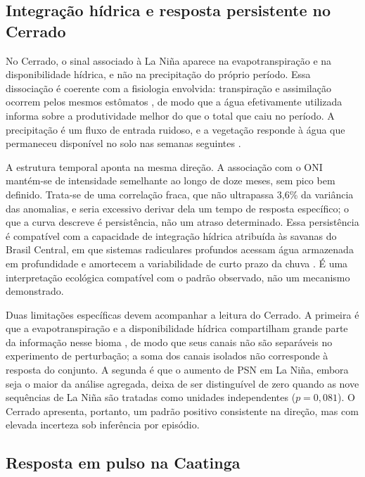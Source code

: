 \documentclass[a4paper,fleqn]{cas-sc}
\begin{document}
\subsection{Integração hídrica e resposta persistente no Cerrado}

No Cerrado, o sinal associado à La Niña aparece na evapotranspiração e na disponibilidade hídrica, e não na precipitação do próprio período. Essa dissociação é coerente com a fisiologia envolvida: transpiração e assimilação ocorrem pelos mesmos estômatos \citep{lawson2019}, de modo que a água efetivamente utilizada informa sobre a produtividade melhor do que o total que caiu no período. A precipitação é um fluxo de entrada ruidoso, e a vegetação responde à água que permaneceu disponível no solo nas semanas seguintes \citep{oliveira2005, schwinning2004}.

A estrutura temporal aponta na mesma direção. A associação com o ONI mantém-se de intensidade semelhante ao longo de doze meses, sem pico bem definido. Trata-se de uma correlação fraca, que não ultrapassa 3,6\% da variância das anomalias, e seria excessivo derivar dela um tempo de resposta específico; o que a curva descreve é persistência, não um atraso determinado. Essa persistência é compatível com a capacidade de integração hídrica atribuída às savanas do Brasil Central, em que sistemas radiculares profundos acessam água armazenada em profundidade e amortecem a variabilidade de curto prazo da chuva \citep{oliveira2005, bucci2008}. É uma interpretação ecológica compatível com o padrão observado, não um mecanismo demonstrado.

Duas limitações específicas devem acompanhar a leitura do Cerrado. A primeira é que a evapotranspiração e a disponibilidade hídrica compartilham grande parte da informação nesse bioma \citep{oliveira2026}, de modo que seus canais não são separáveis no experimento de perturbação; a soma dos canais isolados não corresponde à resposta do conjunto. A segunda é que o aumento de PSN em La Niña, embora seja o maior da análise agregada, deixa de ser distinguível de zero quando as nove sequências de La Niña são tratadas como unidades independentes ($p = 0{,}081$). O Cerrado apresenta, portanto, um padrão positivo consistente na direção, mas com elevada incerteza sob inferência por episódio.

\subsection{Resposta em pulso na Caatinga}
\end{document}
